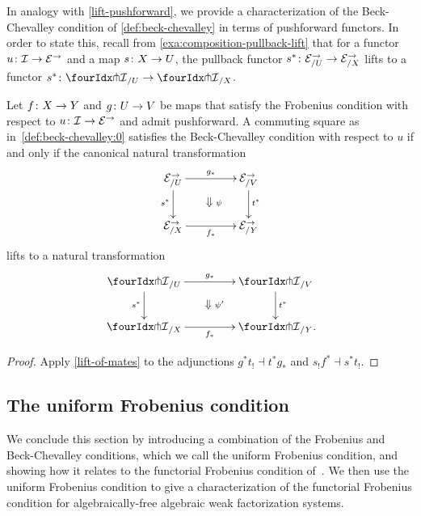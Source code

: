 \documentclass[reqno,10pt,a4paper,oneside,draft]{amsart}
\begin{document}
In analogy with \cref{lift-pushforward}, we provide a characterization of the Beck-Chevalley condition of \cref{def:beck-chevalley} in terms of pushforward functors.
In order to state this, recall from \cref{exa:composition-pullback-lift} that for a functor $u \colon \mathcal{I} \to \mathcal{E}^\to$ and a map $s \colon X \to U$, the pullback functor $s^* \colon \mathcal{E}^\to_{/U} \to \mathcal{E}^\to_{/X}$ lifts to a functor $s^* \co {\liftr{\cal{I}}}_{/U} \to {\liftr{\cal{I}}}_{/X}$.

\begin{proposition} \label{lift-pushforward-BC}
Let $f \colon X \to Y$ and $g \colon U \to V$ be maps that satisfy the Frobenius condition with respect to $u \colon \mathcal{I} \to \mathcal{E}^\to$ and admit pushforward.
A commuting square as in~\eqref{def:beck-chevalley:0} satisfies the Beck-Chevalley condition with respect to $u$ if and only if the canonical natural transformation
\[
\xymatrix@C+2em{
  \catE^\to_{/U}
  \ar[r]^{g_*}
  \ar[d]_{s^*}
  \ar@{}[dr]|{\textstyle\Downarrow \rlap{$\labelstyle\psi$}}
&
  \catE^\to_{/V}
  \ar[d]^{t^*}
\\
  \catE^\to_{/X}
  \ar[r]_{f_*}
&
  \catE^\to_{/Y}
}
\]
lifts to a natural transformation
\[
\xymatrix@C+2em{
  {\liftr{\cal{I}}}_{/U}
  \ar[r]^{g_*}
  \ar[d]_{s^*}
  \ar@{}[dr]|{\textstyle\Downarrow \rlap{$\labelstyle\psi'$}}
&
  {\liftr{\cal{I}}}_{/V}
  \ar[d]^{t^*}
\\
  {\liftr{\cal{I}}}_{/X}
  \ar[r]_{f_*}
&
  {\liftr{\cal{I}}}_{/Y}
\rlap{.}}
\]
\end{proposition}

\begin{proof}
Apply \cref{lift-of-mates} to the adjunctions $g^* t_! \dashv t^* g_*$ and $s_! f^* \dashv s^* t_!$.
\end{proof}

\subsection*{The uniform Frobenius condition}

We conclude this section by introducing a combination of the Frobenius and Beck-Chevalley conditions, which we call the uniform Frobenius condition, and showing how it relates to the functorial Frobenius condition of~\cite{garner:topological-simplicial}.
We then use the uniform Frobenius condition to give a characterization of the functorial Frobenius condition for algebraically-free algebraic weak factorization systems.
\end{document}
